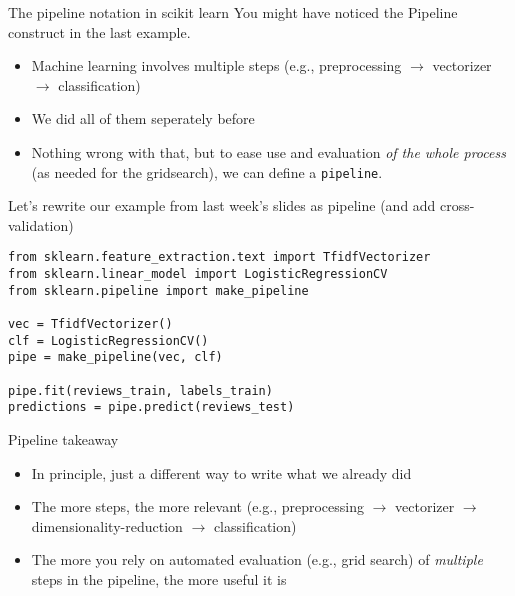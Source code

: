 \begin{frame}{The pipeline notation in scikit learn}
You might have noticed the Pipeline construct in the last example.
\begin{itemize}
\item Machine learning involves multiple steps (e.g., preprocessing $\rightarrow$ vectorizer $\rightarrow$ classification)
\item We did all of them seperately before
\item Nothing wrong with that, but to ease use and evaluation \emph{of the whole process} (as needed for the gridsearch), we can define a \texttt{pipeline}.
\end{itemize}
	
\end{frame}

\begin{frame}[fragile]{Let's rewrite our example from last week's slides as pipeline (and add cross-validation)}
\begin{verbatim}
from sklearn.feature_extraction.text import TfidfVectorizer
from sklearn.linear_model import LogisticRegressionCV
from sklearn.pipeline import make_pipeline

vec = TfidfVectorizer()
clf = LogisticRegressionCV()
pipe = make_pipeline(vec, clf)

pipe.fit(reviews_train, labels_train)
predictions = pipe.predict(reviews_test)
\end{verbatim}
\end{frame}

\begin{frame}{Pipeline takeaway}
  \begin{itemize}
  \item In principle, just a different way to write what we already did
  \item The more steps, the more relevant (e.g., preprocessing $\rightarrow$ vectorizer $\rightarrow$ dimensionality-reduction $\rightarrow$ classification)
  \item The more you rely on automated evaluation (e.g., grid search) of \emph{multiple} steps in the pipeline, the more useful it is
  \end{itemize}
\end{frame}




